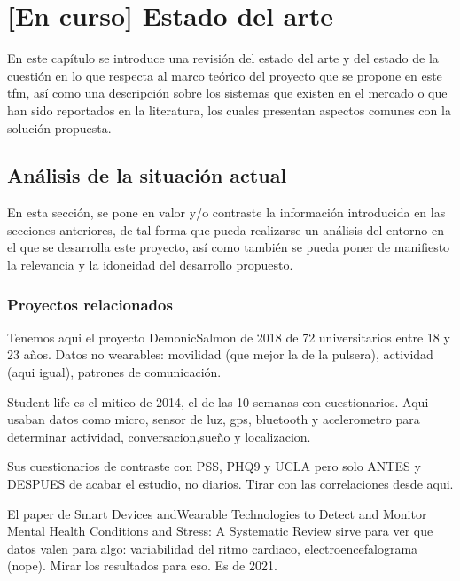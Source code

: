\chapter{[En curso] Estado del arte}
\label{chapter:estado_arte}



En este capítulo se introduce una revisión del estado del arte y del estado de la cuestión en lo que respecta al marco teórico del proyecto que se propone en este \gls{tfm}, así como una descripción sobre los sistemas que existen en el mercado o que han sido reportados en la literatura, los cuales presentan aspectos comunes con la solución propuesta.


\section{Análisis de la situación actual}

En esta sección, se pone en valor y/o contraste la información introducida en las secciones anteriores, de tal forma que pueda realizarse un análisis del entorno en el que se desarrolla este proyecto, así como también se pueda poner de manifiesto la relevancia y la idoneidad del desarrollo propuesto. 



\subsection{Proyectos relacionados}

Tenemos aqui el proyecto DemonicSalmon de 2018 de 72 universitarios entre 18 y 23 años. Datos no wearables: movilidad (que mejor la de la pulsera), actividad (aqui igual), patrones de comunicación.

Student life es el mitico de 2014, el de las 10 semanas con cuestionarios. Aqui usaban datos como micro, sensor de luz, gps, bluetooth y acelerometro para determinar actividad, conversacion,sueño y localizacion.

Sus cuestionarios de contraste con PSS, PHQ9 y UCLA pero solo ANTES y DESPUES de acabar el estudio, no diarios. Tirar con las correlaciones desde aqui.

El paper de Smart Devices andWearable Technologies to Detect and
Monitor Mental Health Conditions and Stress:
A Systematic Review sirve para ver que datos valen para algo: variabilidad del ritmo cardiaco,  electroencefalograma (nope). Mirar los resultados para eso. Es de 2021.

